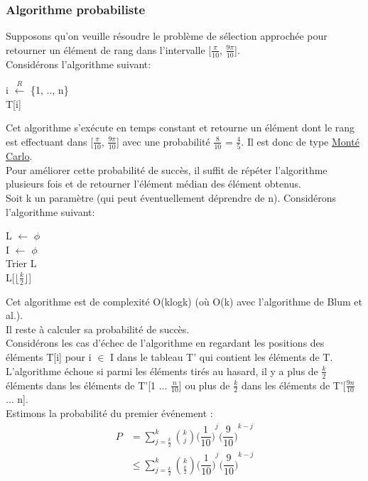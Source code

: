 \documentclass[12pt,a4paper]{article}
\begin{document}
\subsubsection{Algorithme probabiliste}
Supposons qu'on veuille résoudre le problème de sélection approchée pour retourner un élément de rang dans l'intervalle [$\frac{\pi}{10}$, $\frac{9\pi}{10}$].\\
Considérons l'algorithme suivant:\\
\begin{algorithm}[H]
	i $\xleftarrow{R}$ \{1, .., n\}\\
	\Return T[i]
\end{algorithm}
Cet algorithme s'exécute en temps constant et retourne un élément dont le rang est effectuant dans [$\frac{\pi}{10}$, $\frac{9\pi}{10}$] avec une probabilité $\frac{8}{10}$ = $\frac{4}{5}$. Il est donc de type \underline{Monté Carlo}.\\
Pour améliorer cette probabilité  de succès, il suffit de répéter l'algorithme plusieurs fois et de retourner l'élément médian des élément obtenus.\\
Soit k un paramètre (qui peut éventuellement déprendre de n).
Considérons l'algorithme suivant:\\
\begin{algorithm}[H]
	L $\gets$ $\phi$\\
	I $\gets$ $\phi$\\
	Trier L\\
	\Return L[$\lfloor\frac{k}{2}\rfloor$]
\end{algorithm}
Cet algorithme est de complexité O(klogk) (où O(k) avec l'algorithme de Blum et al.).\\
Il reste à calculer sa probabilité de succès.\\
Considérons les cas d'échec de l'algorithme en regardant les positions des éléments T[i] pour i $\in$ I dans le tableau T' qui contient les éléments de T.\\
L'algorithme échoue si parmi les éléments tirés au hasard, il y a plus de $\frac{k}{2}$ éléments dans les éléments de T'[1 ... $\frac{n}{10}$] ou plus de $\frac{k}{2}$ dans les éléments de T'[$\frac{9n}{10}$ ... n].\\
Estimons la probabilité du premier événement :
\begin{equation} 
\begin{split}\nonumber
P &= \sum\limits_{j = \frac{k}{2}}^{k} \binom{k}{j} {\bigg(\dfrac{1}{10}\bigg)}^j {\bigg(\dfrac{9}{10}\bigg)}^{k - j}\\
&\leq \sum\limits_{j = \frac{k}{2}}^{k} \binom{k}{\frac{k}{2}} {\bigg(\dfrac{1}{10}\bigg)}^j {\bigg(\dfrac{9}{10}\bigg)}^{k - j}
\end{split}
\end{equation}
\end{document}
